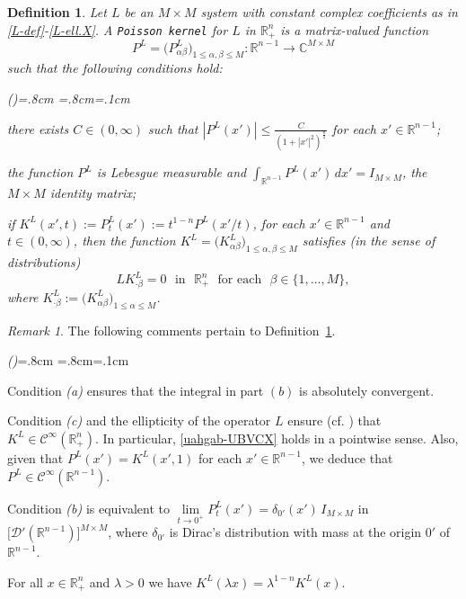 \documentclass[11pt,reqno]{amsart}
\numberwithin{equation}{section}
\newtheorem{definition}[theorem]{Definition}
\theoremstyle{remark}
\newtheorem{remark}[theorem]{Remark}
\begin{document}
\begin{definition}\label{defi:Poisson}
Let $L$ be an $M\times M$ system with constant complex coefficients as in \eqref{L-def}-\eqref{L-ell.X}.
A {\tt Poisson kernel} for $L$ in $\mathbb{R}^{n}_{+}$ is a matrix-valued function
%
\begin{equation}\label{uahgab-Uan}
P^L=\big(P^L_{\alpha\beta}\big)_{1\leq\alpha,\beta\leq M}:\mathbb{R}^{n-1}\longrightarrow\mathbb{C}^{M\times M}
\end{equation}
%
such that the following conditions hold:
%
\begin{list}{(\theenumi)}{\leftmargin=.8cm
=.8cm\itemsep=0.2cm\topsep=.1cm
\renewcommand{\theenumi}{\alph{enumi}}}
%
\item there exists $C\in(0,\infty)$ such that
$\displaystyle|P^L(x')|\leq\frac{C}{(1+|x'|^2)^{\frac{n}2}}$ for each
$x'\in\mathbb{R}^{n-1}$;
%
\item the function $P^L$ is Lebesgue measurable and
$\displaystyle\int_{\mathbb{R}^{n-1}}P^L(x')\,dx'=I_{M\times M}$,
the $M\times M$ identity matrix;
%
\item if $K^L(x',t):=P^L_t(x'):=t^{1-n}P^L(x'/t)$, for each
$x'\in\mathbb{R}^{n-1}$ and $t\in(0,\infty)$, then the function
$K^L=\big(K^L_{\alpha\beta}\big)_{1\leq\alpha,\beta\leq M}$
satisfies {\rm (}in the sense of distributions{\rm )}
%
\begin{equation}\label{uahgab-UBVCX}
LK^L_{\cdot\beta}=0\,\,\text{ in }\,\,\mathbb{R}^{n}_{+}
\,\,\text{ for each }\,\,\beta\in\{1,\dots,M\},
\end{equation}
%
where $K^L_{\cdot\beta}:=\big(K^L_{\alpha\beta}\big)_{1\leq\alpha\leq M}$.
\end{list}
\end{definition}

\vskip 0.06in
\begin{remark}\label{Ryf-uyf}
The following comments pertain to Definition~\ref{defi:Poisson}.
%
\begin{list}{\textit{(\theenumi)}}{\leftmargin=.8cm
=.8cm\itemsep=0.2cm\topsep=.1cm
\renewcommand{\theenumi}{\roman{enumi}}}
%
\item Condition {\it (a)} ensures that the integral in part $(b)$ is
absolutely convergent.
%
\item Condition {\it (c)} and the ellipticity of the operator $L$ ensure
(cf. \cite[Theorem~10.9, pp.\,363-364]{DMit18}) that
$K^L\in{\mathscr{C}}^\infty(\mathbb{R}^{n}_{+})$. In particular, \eqref{uahgab-UBVCX}
holds in a pointwise sense. Also, given that $P^L(x')=K^L(x',1)$ for each
$x'\in{\mathbb{R}}^{n-1}$, we deduce that $P^L\in{\mathscr{C}}^\infty(\mathbb{R}^{n-1})$.
%
\item Condition {\it (b)} is equivalent to $\lim\limits_{t\to 0^{+}}P^L_t(x')
=\delta_{0'}(x')\,I_{M\times M}$ in $\big[{\mathcal{D}}'({\mathbb{R}}^{n-1})\big]^{M\times M}$,
where $\delta_{0'}$ is Dirac's distribution with mass at the origin $0'$
of ${\mathbb{R}}^{n-1}$.
%
\item For all $x\in{\mathbb{R}}^n_{+}$ and $\lambda>0$ we have $K^L(\lambda x)=\lambda^{1-n}K^L(x)$.
\end{list}
\end{remark}
\end{document}
